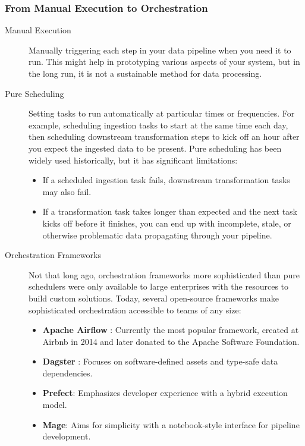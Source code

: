 \documentclass{article}
\begin{document}
\subsubsection{From Manual Execution to Orchestration}
\begin{description}
    \item[Manual Execution] Manually triggering each step in your data pipeline when you need it to run. This might help in prototyping various aspects of your system, but in the long run, it is not a sustainable method for data processing.

    \item[Pure Scheduling] Setting tasks to run automatically at particular times or frequencies. For example, scheduling ingestion tasks to start at the same time each day, then scheduling downstream transformation steps to kick off an hour after you expect the ingested data to be present. Pure scheduling has been widely used historically, but it has significant limitations:
    \begin{itemize}
        \item If a scheduled ingestion task fails, downstream transformation tasks may also fail.
        \item If a transformation task takes longer than expected and the next task kicks off before it finishes, you can end up with incomplete, stale, or otherwise problematic data propagating through your pipeline.
    \end{itemize}

    \item[Orchestration Frameworks] Not that long ago, orchestration frameworks more sophisticated than pure schedulers were only available to large enterprises with the resources to build custom solutions. Today, several open-source frameworks make sophisticated orchestration accessible to teams of any size:
    \begin{itemize}
        \item \textbf{Apache Airflow} \cite{airflow2015}: Currently the most popular framework, created at Airbnb in 2014 and later donated to the Apache Software Foundation.
        \item \textbf{Dagster} \cite{dagster2019}: Focuses on software-defined assets and type-safe data dependencies.
        \item \textbf{Prefect}: Emphasizes developer experience with a hybrid execution model.
        \item \textbf{Mage}: Aims for simplicity with a notebook-style interface for pipeline development.
    \end{itemize}


\end{description}
\end{document}
